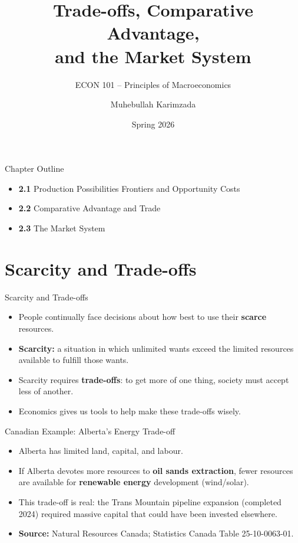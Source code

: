 \documentclass[aspectratio=169]{beamer}
\title{\textbf{Trade-offs, Comparative Advantage,\\ and the Market System}}
\subtitle{{\large ECON 101 -- Principles of Macroeconomics}}
\author{Muhebullah Karimzada}
\date{Spring 2026}
\begin{document}

\begin{frame}[plain]
  \titlepage
\end{frame}

\begin{frame}{Chapter Outline}
\transfade
\begin{itemize}
  \item \textbf{2.1} Production Possibilities Frontiers and Opportunity Costs
  \item \textbf{2.2} Comparative Advantage and Trade
  \item \textbf{2.3} The Market System
\end{itemize}
\end{frame}

\section{Scarcity and Trade-offs}

\begin{frame}{Scarcity and Trade-offs}
\transfade
\begin{itemize}
  \item People continually face decisions about how best to use their \textbf{scarce} resources.
  \item \textbf{Scarcity:} a situation in which unlimited wants exceed the limited resources available to fulfill those wants.
  \item Scarcity requires \textbf{trade-offs}: to get more of one thing, society must accept less of another.
  \item Economics gives us tools to help make these trade-offs wisely.
\end{itemize}
\end{frame}

\begin{frame}{Canadian Example: Alberta's Energy Trade-off}
\transfade
\begin{itemize}
  \item Alberta has limited land, capital, and labour.
  \item If Alberta devotes more resources to \textbf{oil sands extraction}, fewer resources are available for \textbf{renewable energy} development (wind/solar).
  \item This trade-off is real: the Trans Mountain pipeline expansion (completed 2024) required massive capital that could have been invested elsewhere.
  \item \textbf{Source:} Natural Resources Canada; Statistics Canada Table 25-10-0063-01.
\end{itemize}
\end{frame}
\end{document}
